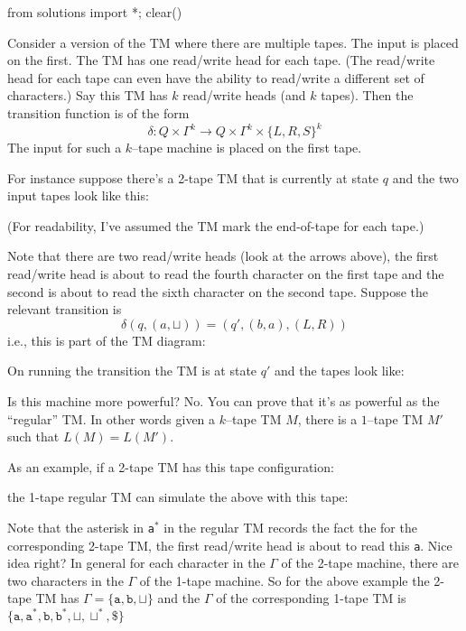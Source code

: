 \begin{python0}
from solutions import *; clear()
\end{python0}

Consider a version of the TM where there are multiple tapes. The
input is placed on the first. The TM has one read/write head for
each tape.
(The read/write head for each tape can even have
the ability to read/write a different set of characters.)
Say this TM has $k$ read/write heads (and $k$ tapes).
Then the transition function is of the form
\[
\delta : Q \times \Gamma^k \rightarrow Q \times \Gamma^k \times \{L,R,S\}^k
\]
The input for such a $k$--tape machine is placed on the first tape.


For instance suppose there's a 2-tape TM that is currently
at state $q$ and the two input tapes look like this:

(For readability, I've assumed the TM mark the end-of-tape for each tape.)

Note that there are two read/write heads (look at the arrows
above), the first read/write
head is about to read the fourth character on the first tape
and the second is about to read the sixth character on the second
tape.
Suppose the
relevant transition is
\[
\delta(q, (a, \sqcup)) = (q', (b, a), (L, R))
\]
i.e., this is part of the TM diagram:
\begin{center}
\end{center}
On running the transition the TM is at state $q'$ and the
tapes look like:


Is this machine more powerful? No. You can prove that
it's as powerful as the ``regular'' TM. In other words given a
$k$--tape TM $M$, there is a $1$--tape TM $M'$ such that $L(M) =
L(M')$.

As an example, if a 2-tape TM has this tape configuration:

the 1-tape regular TM can simulate the above with this tape:

Note that the asterisk in \texttt{a$^*$} in the regular TM
records the fact the for the corresponding 2-tape TM,
the first read/write head is about to read this \texttt{a}.
Nice idea right?
In general for each character in the $\Gamma$ of the 2-tape machine,
there are two characters in the $\Gamma$ of the 1-tape machine.
So for the above example the 2-tape TM has
$\Gamma = \{\texttt{a}, \texttt{b}, \sqcup\}$
and the $\Gamma$ of the corresponding 1-tape TM is
$\{\texttt{a}, \texttt{a$^*$},
\texttt{b}, \texttt{b$^*$},
\sqcup, \sqcup^*, \texttt{\$}\}$

